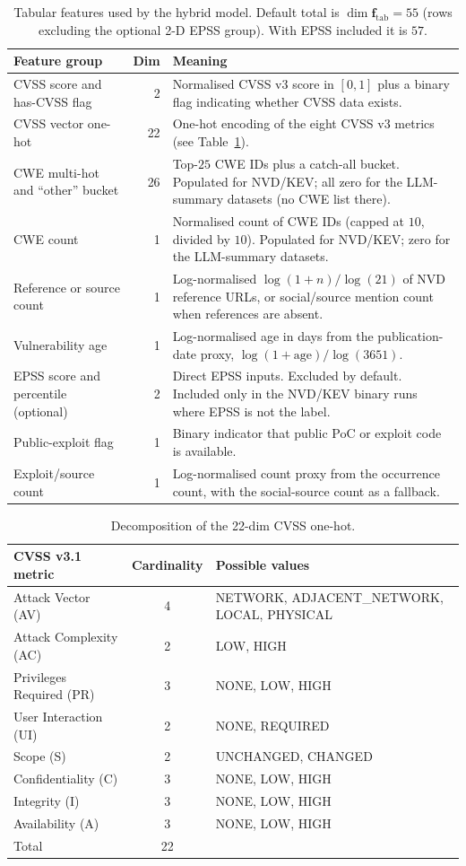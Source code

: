 \documentclass[11pt]{article}
\begin{document}
\begin{table}[h]
\centering
\small
\begin{tabular}{p{}rp{}}
\toprule
Feature group & Dim & Meaning \\
\midrule
CVSS score and has-CVSS flag & 2 & Normalised CVSS v3 score in $[0, 1]$ plus a binary flag indicating whether CVSS data exists. \\
CVSS vector one-hot & 22 & One-hot encoding of the eight CVSS v3 metrics (see Table~\ref{tab:cvss22}). \\
CWE multi-hot and ``other'' bucket & 26 & Top-$25$ CWE IDs plus a catch-all bucket. Populated for NVD/KEV; all zero for the LLM-summary datasets (no CWE list there). \\
CWE count & 1 & Normalised count of CWE IDs (capped at $10$, divided by $10$). Populated for NVD/KEV; zero for the LLM-summary datasets. \\
Reference or source count & 1 & Log-normalised $\log(1 + n) / \log(21)$ of NVD reference URLs, or social/source mention count when references are absent. \\
Vulnerability age & 1 & Log-normalised age in days from the publication-date proxy, $\log(1 + \text{age}) / \log(3651)$. \\
EPSS score and percentile (optional) & 2 & Direct EPSS inputs. Excluded by default. Included only in the NVD/KEV binary runs where EPSS is not the label. \\
Public-exploit flag & 1 & Binary indicator that public PoC or exploit code is available. \\
Exploit/source count & 1 & Log-normalised count proxy from the occurrence count, with the social-source count as a fallback. \\
\bottomrule
\end{tabular}
\caption{Tabular features used by the hybrid model. Default total is
$\dim \mathbf{f}_{\text{tab}} = 55$ (rows excluding the optional 2-D
EPSS group). With EPSS included it is $57$.}
\end{table}

\begin{table}[h]
\centering
\small
\begin{tabular}{lcl}
\toprule
CVSS v3.1 metric & Cardinality & Possible values \\
\midrule
Attack Vector (AV) & 4 & NETWORK, ADJACENT\_NETWORK, LOCAL, PHYSICAL \\
Attack Complexity (AC) & 2 & LOW, HIGH \\
Privileges Required (PR) & 3 & NONE, LOW, HIGH \\
User Interaction (UI) & 2 & NONE, REQUIRED \\
Scope (S) & 2 & UNCHANGED, CHANGED \\
Confidentiality (C) & 3 & NONE, LOW, HIGH \\
Integrity (I) & 3 & NONE, LOW, HIGH \\
Availability (A) & 3 & NONE, LOW, HIGH \\
\midrule
Total & 22 & \\
\bottomrule
\end{tabular}
\caption{Decomposition of the 22-dim CVSS one-hot.}
\label{tab:cvss22}
\end{table}
\end{document}
